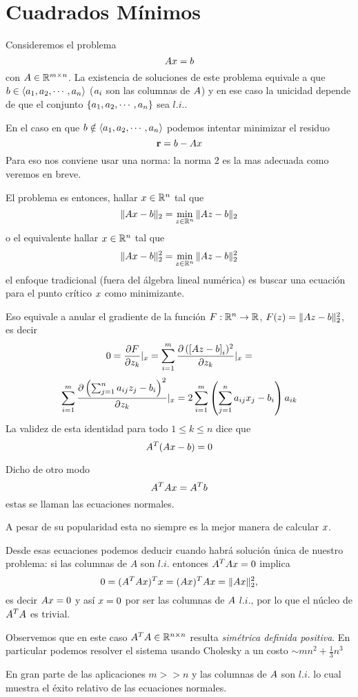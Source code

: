 \chapter{Cuadrados Mínimos}
Consideremos el problema
$$
\Ab\xb=\bb
$$
con $\Ab\in \Rmn$. La existencia de soluciones de este problema equivale a que
$\bb\in \langle \ab_1,  \ab_2,\cdots , \ab_n\rangle$ ($\ab_{i}$ son las columnas de $\Ab$) y en ese caso la unicidad depende de que el conjunto
$\{ \ab_1,  \ab_2,\cdots , \ab_n\}$ sea $l.i.$.

En el caso en que $\bb\notin \langle  \ab_1,  \ab_2,\cdots , \ab_n\rangle$
podemos intentar minimizar el residuo
$$
\rb=\bb-\Ab\xb
$$
Para eso nos conviene usar una norma: la norma $2$  es la mas adecuada como veremos en breve.

El problema es entonces,  hallar $\xb\in \Rn$ tal que
$$
\|\Ab\xb-\bb\|_2=\min_{\zb\in \Rn}\|\Ab\zb-\bb\|_2
$$
o el equivalente
hallar $\xb\in \Rn$ tal que
$$
\|\Ab\xb-\bb\|_2^2=\min_{\zb\in \Rn}\|\Ab\zb-\bb\|_2^2
$$
el enfoque tradicional (fuera del álgebra lineal numérica) es buscar una ecuación para el punto crítico $\xb$ como minimizante.

Eso equivale a anular el gradiente de la función $F:\mathbb R^{n}\to \mathbb R$, $F(\zb)=\|\Ab\zb-\bb\|_2^2$, es decir
$$
0=\frac{\partial F}{\partial z_k}|_{\xb}=\sum_{i=1}^m\frac{\partial \left( [\Ab\zb-\bb \right]_i)^2}{\partial z_k}|_{\xb}=
$$
$$
\sum_{i=1}^m\frac{\partial \left( \sum_{j=1}^na_{ij}z_j-b_i \right)^2}{\partial z_k}|_{\xb}=2\sum_{i=1}^m\left( \sum_{j=1}^na_{ij}x_j-b_i\right)a_{ik}
$$
La validez de esta identidad para todo $1\le k\le n$ dice que
$$
\Ab^T(\Ab\xb-\bb)=\cero
$$

Dicho de otro modo
$$
\Ab^T\Ab\xb=\Ab^T\bb
$$
estas se llaman las ecuaciones normales.

A pesar de su popularidad esta no siempre es la mejor manera de calcular $\xb$.


Desde esas ecuaciones podemos deducir cuando habrá solución única de nuestro problema: si las columnas de $A$ son $l.i.$ entonces $\Ab^T\Ab\xb=\cero$ implica
$$
0=(\Ab^T\Ab\xb)^T\xb=(\Ab\xb)^T\Ab\xb=\|\Ab\xb\|_2^2,
$$
es decir $\Ab\xb=\cero$ y así $\xb=\cero$ por ser las columnas de $\Ab$ $l.i.$, por lo que el núcleo de $\Ab^T\Ab$ es trivial.

Observemos que en este caso $\Ab^T\Ab\in \Rnn$ resulta \emph{simétrica definida positiva}.
En particular podemos resolver el sistema usando Cholesky a un costo $\sim mn^2+ \frac{1}{3}n^{3}$

En gran parte de las aplicaciones $m >> n$ y las columnas de $\Ab$ son $l.i.$ lo cual muestra el éxito relativo de las ecuaciones normales.
